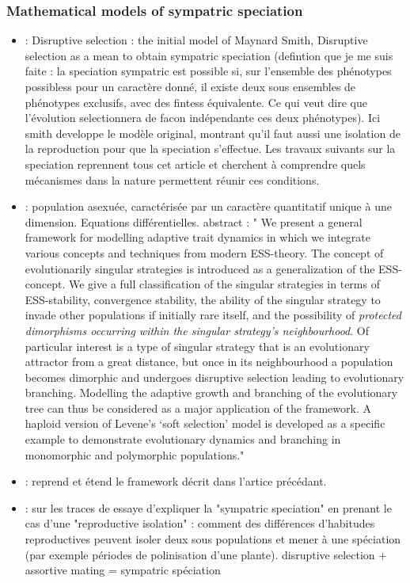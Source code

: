 \documentclass[a4paper,10pt]{article}
\begin{document}
\subsubsection{Mathematical models of sympatric speciation}
\begin{itemize}
\item \cite{maynardsmith1962disruptiveselectionpolymorphsympatricspeciation} : Disruptive selection : the initial model of Maynard Smith, Disruptive selection as a mean to obtain sympatric speciation (defintion que je me suis faite : la speciation sympatric est possible si, sur l'ensemble des phénotypes possibless pour un caractère donné, il existe deux sous ensembles de phénotypes exclusifs, avec des fintess équivalente. Ce qui veut dire que l'évolution selectionnera de facon indépendante ces deux phénotypes). Ici smith developpe le modèle original, montrant qu'il faut aussi une isolation de la reproduction pour que la speciation s'effectue. Les travaux suivants sur la speciation  reprennent tous cet article et cherchent à comprendre quels mécanismes dans la nature permettent réunir ces conditions.

\item \cite{geritz97dynamicsadaptationevolutionarybranching} : population asexuée, caractérisée par un caractère quantitatif unique à une dimension. Equations différentielles. abstract : "	We present a general framework for modelling adaptive trait dynamics in which we integrate various concepts and techniques from modern ESS-theory. The concept of evolutionarily singular strategies is introduced as a generalization of the ESS-concept. We give a full classification of the singular strategies in terms of ESS-stability, convergence stability, the ability of the singular strategy to invade other populations if initially rare itself, and the possibility of \emph{protected dimorphisms occurring within the singular strategy's neighbourhood}. Of particular interest is a type of singular strategy that is an evolutionary attractor from a great distance, but once in its neighbourhood a population becomes dimorphic and undergoes disruptive selection leading to evolutionary branching. Modelling the adaptive growth and branching of the evolutionary tree can thus be considered as a major application of the framework. A haploid version of Levene's ‘soft selection’ model is developed as a specific example to demonstrate evolutionary dynamics and branching in monomorphic and polymorphic populations."
\item \cite{geritz97evolutionarilysingularstrategiesadaptivegrowthbranchingevolutionarytree} : reprend et étend le framework décrit dans l'artice précédant. 
\item \cite{rice1987speciationviahabitaspecialization} : sur les traces de \cite{maynardsmith1962disruptiveselectionpolymorphsympatricspeciation} essaye d'expliquer la "sympatric speciation" en prenant le cas d'une "reproductive isolation" : comment des différences d'habitudes reproductives peuvent isoler deux sous populations et mener à une spéciation (par exemple périodes de polinisation d'une plante). disruptive selection + assortive mating = sympatric spéciation

\end{itemize}
\end{document}
